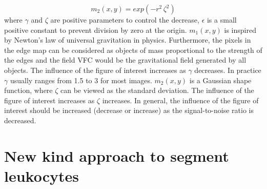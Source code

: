 \begin{equation}
{m} _{2} ( x,y ) =exp(-r^{2}\, \zeta ^{2})
\end{equation}
where $\gamma$ and $\zeta$ are positive parameters to control the decrease, $\epsilon$ is a small positive constant to prevent division by zero at the origin. ${m} _{1} ( x,y )$ is inspired by Newton’s law  of universal gravitation in physics. Furthermore, the pixels in the edge map can be considered as objects of mass proportional to the strength of the edges and the field VFC would be the gravitational field generated by all objects. The influence of the figure of interest increases as $\gamma$ decreases. In practice $\gamma$ usually ranges from 1.5 to 3 for most images. ${m} _{2} ( x,y )$ is a Gaussian shape function, where $\zeta$ can be viewed as the standard deviation. The influence of the figure of interest increases as $\zeta$ increases. In general, the influence of the figure of interest should be increased (decrease or increase) as the signal-to-noise ratio is decreased.\cite{VFC}


\section{New kind approach to segment leukocytes}